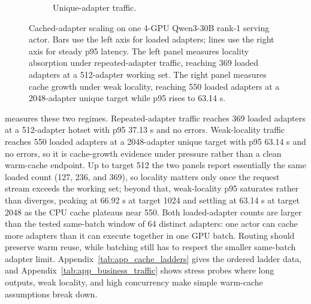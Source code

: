 \documentclass{llmxive}
\begin{document}
\begin{figure}[!htbp]
\begin{subfigure}[t]{0.48\textwidth}
{
}
        \caption{Unique-adapter traffic.}
        \label{fig:e4_true_unique_frontier}
    \end{subfigure}
    \vspace{-10PT}
    \caption{Cached-adapter scaling on one 4-GPU Qwen3-30B rank-1 serving actor. Bars use the left axis for loaded adapters; lines use the right axis for steady p95 latency. The left panel measures locality absorption under repeated-adapter traffic, reaching 369 loaded adapters at a 512-adapter working set. The right panel measures cache growth under weak locality, reaching 550 loaded adapters at a 2048-adapter unique target while p95 rises to 63.14 s.}
    \vspace{-10PT}
    \label{fig:e4_cache_ladders}
\end{figure}

 measures these two regimes. Repeated-adapter traffic reaches 369 loaded adapters at a 512-adapter hotset with p95 37.13 s and no errors. Weak-locality traffic reaches 550 loaded adapters at a 2048-adapter unique target with p95 63.14 s and no errors, so it is cache-growth evidence under pressure rather than a clean warm-cache endpoint. Up to target 512 the two panels report essentially the same loaded count (127, 236, and 369), so locality matters only once the request stream exceeds the working set; beyond that, weak-locality p95 saturates rather than diverges, peaking at 66.92 s at target 1024 and settling at 63.14 s at target 2048 as the CPU cache plateaus near 550. Both loaded-adapter counts are larger than the tested same-batch window of 64 distinct adapters: one actor can cache more adapters than it can execute together in one GPU batch. Routing should preserve warm reuse, while batching still has to respect the smaller same-batch adapter limit. Appendix~\cref{tab:app_cache_ladders} gives the ordered ladder data, and Appendix~\cref{tab:app_business_traffic} shows stress probes where long outputs, weak locality, and high concurrency make simple warm-cache assumptions break down.
\end{document}
